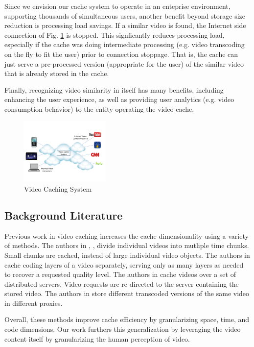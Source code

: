 \documentclass{article}
\begin{document}
Since we envision our cache system to operate in an enteprise environment, supporting thousands of simultaneous users, another benefit beyond storage size reduction is processing load savings. If a similar video is found, the Internet side connection of Fig. \ref{figure:Video Caching System} is stopped. This signficantly reduces processing load, especially if the cache was doing intermediate processing (e.g. video transcoding on the fly to fit the user) prior to connection stoppage. That is, the cache can just serve a pre-processed version (appropriate for the user) of the similar video that is already stored in the cache.

Finally, recognizing video similarity in itself has many benefits, including enhancing the user experience, as well as providing user analytics (e.g. video consumption behavior) to the entity operating the video cache.

\begin{figure}
\centering
\includegraphics[height=1.3in, viewport=0 75 700 445, clip]{video_cache.pdf}
\caption{Video Caching System}
\label{figure:Video Caching System}
\end{figure}

\subsection{Background Literature}
Previous work in video caching increases the cache dimensionality using a variety of methods. The authors in \cite{Songqing Chen}, \cite{Wei Tu}, \cite{Dohy Hong} divide individual videos into mutliple time chunks. Small chunks are cached, instead of large individual video objects. The authors in \cite{Yago Sanchez} cache coding layers of a video separately, serving only as many layers as needed to recover a requested quality level. The authors in \cite{Jing Li} cache videos over a set of distributed servers. Video requests are re-directed to the server containing the stored video. The authors in \cite{Byoung-Jip Kim} store different transcoded versions of the same video in different proxies. 

Overall, these methods improve cache efficiency by granularizing space, time, and code dimensions. Our work furthers this generalization by leveraging the video content itself by granularizing the human perception of video.
\end{document}
